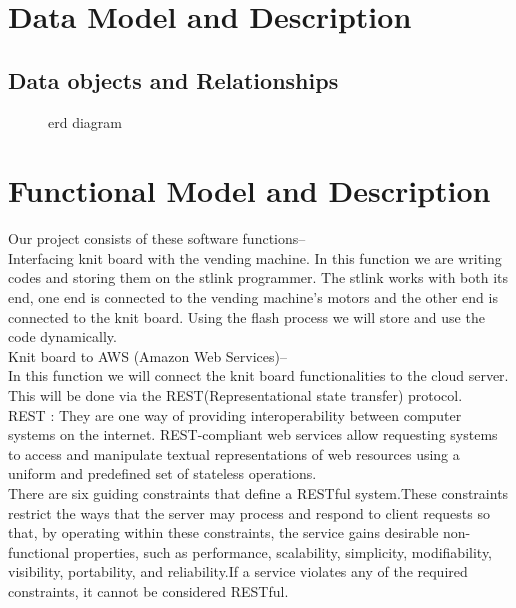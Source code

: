 \documentclass[oneside,a4paper,12pt]{report}
\begin{document}
\section{Data Model and Description}  
\subsection{Data objects and Relationships}
  \begin{center}
	\begin{figure}[!htbp]
		\centering
	  \caption{erd diagram}
	  \label{fig:usecase}
	\end{figure}
\end{center}  
\newpage
\section{Functional Model and Description}  
Our project consists of these software functions--\\
Interfacing knit board with the vending machine.
In this function we are writing codes and storing them on the stlink programmer.
The stlink works with both its end, one end is connected to the vending machine's motors and the other end is connected to the knit board.
Using the flash process we will store and use the code dynamically.\\

Knit board to AWS (Amazon Web Services)--\\
In this function we will connect the knit board functionalities to the cloud server.
This will be done via the REST(Representational state transfer) protocol.\\

REST : They are one way of providing interoperability between computer systems on the internet. REST-compliant web services allow requesting systems to access and manipulate textual representations of web resources using a uniform and predefined set of stateless operations.  \\
There are six guiding constraints that define a RESTful system.These constraints restrict the ways that the server may process and respond to client requests so that, by operating within these constraints, the service gains desirable non-functional properties, such as performance, scalability, simplicity, modifiability, visibility, portability, and reliability.If a service violates any of the required constraints, it cannot be considered RESTful.\\
\end{document}
